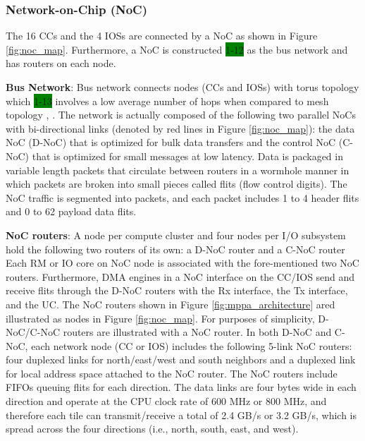 \documentclass[conference,compsoc]{IEEEtran}
\begin{document}


\subsubsection{Network-on-Chip (NoC)}
\label{sec:noc}
The 16 CCs and the 4 IOSs are connected by a NoC as shown in Figure \ref{fig:noc_map}.
Furthermore, a NoC is constructed \colorbox{green}{1-12} as the bus network and has routers on each node.

\textbf{Bus Network}:
Bus network connects nodes (CCs and IOSs) with torus topology \cite{dally2001route}
which \colorbox{green}{1-13} involves a low average number of hops when compared to mesh topology \cite{vangal200780}, \cite{taylor2002raw}.
The network is actually composed of the following two parallel NoCs with bi-directional links (denoted by red lines in Figure \ref{fig:noc_map}):
the data NoC (D-NoC) that is optimized for bulk data transfers and the control NoC (C-NoC) that is optimized for small messages at low latency.
Data is packaged in variable length packets that circulate between routers in a wormhole manner in which packets are broken into small pieces called flits (flow control digits).
The NoC traffic is segmented into packets, and each packet includes 1 to 4 header flits and 0 to 62 payload data flits.

\textbf{NoC routers}:
A node per compute cluster and four nodes per I/O subsystem hold the following two routers of its own: a D-NoC router and a C-NoC router
Each RM or IO core on NoC node is associated with the fore-mentioned two NoC routers.
Furthermore, DMA engines in a NoC interface on the CC/IOS send and receive flits through the D-NoC routers with the Rx interface, the Tx interface, and the UC.
The NoC routers shown in Figure \ref{fig:mppa_architecture} ared illustrated as nodes in Figure \ref{fig:noc_map}.
For purposes of simplicity, D-NoC/C-NoC routers are illustrated with a NoC router.
In both D-NoC and C-NoC, each network node (CC or IOS)  includes the following 5-link NoC routers:
four duplexed links for north/east/west and south neighbors and a duplexed link for local address space attached to the NoC router.
The NoC routers include FIFOs queuing flits for each direction.
The data links are four bytes wide in each direction and operate at the CPU clock rate of 600 MHz or 800 MHz, and therefore each tile can transmit/receive a total of 2.4 GB/s or 3.2 GB/s, which is spread across the four directions (i.e., north, south, east, and west).
\end{document}
